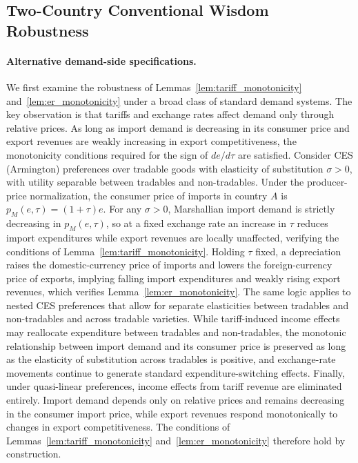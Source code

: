 \documentclass[11pt]{article}
\theoremstyle{plain}
\theoremstyle{remark}
\numberwithin{lemma}{section}
\numberwithin{proposition}{section}
\numberwithin{corollary}{section}
\begin{document}
\newpage
\begin{appendix}

\section{Two-Country Conventional Wisdom Robustness}
\label{app:robustness}

\paragraph{Alternative demand-side specifications.}
We first examine the robustness of Lemmas~\ref{lem:tariff_monotonicity} and~\ref{lem:er_monotonicity} under a broad class of standard demand systems. The key observation is that tariffs and exchange rates affect demand only through relative prices. As long as import demand is decreasing in its consumer price and export revenues are weakly increasing in export competitiveness, the monotonicity conditions required for the sign of $de/d\tau$ are satisfied. Consider CES (Armington) preferences over tradable goods with elasticity of substitution $\sigma > 0$, with utility separable between tradables and non-tradables. Under the producer-price normalization, the consumer price of imports in country $A$ is $p_M(e,\tau) = (1+\tau)e$. For any $\sigma > 0$, Marshallian import demand is strictly decreasing in $p_M(e,\tau)$, so at a fixed exchange rate an increase in $\tau$ reduces import expenditures while export revenues are locally unaffected, verifying the conditions of Lemma~\ref{lem:tariff_monotonicity}. Holding $\tau$ fixed, a depreciation raises the domestic-currency price of imports and lowers the foreign-currency price of exports, implying falling import expenditures and weakly rising export revenues, which verifies Lemma~\ref{lem:er_monotonicity}. The same logic applies to nested CES preferences that allow for separate elasticities between tradables and non-tradables and across tradable varieties. While tariff-induced income effects may reallocate expenditure between tradables and non-tradables, the monotonic relationship between import demand and its consumer price is preserved as long as the elasticity of substitution across tradables is positive, and exchange-rate movements continue to generate standard expenditure-switching effects. Finally, under quasi-linear preferences, income effects from tariff revenue are eliminated entirely. Import demand depends only on relative prices and remains decreasing in the consumer import price, while export revenues respond monotonically to changes in export competitiveness. The conditions of Lemmas~\ref{lem:tariff_monotonicity} and~\ref{lem:er_monotonicity} therefore hold by construction.


\end{appendix}
\end{document}
